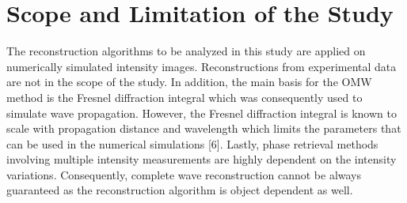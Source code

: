 \section{Scope and Limitation of the Study}
\hspace{\parindent}The reconstruction algorithms to be analyzed in this study are applied on numerically simulated intensity images. Reconstructions from experimental data are not in the scope of the study. In addition, the main basis for the OMW method is the Fresnel diffraction integral which was consequently used to simulate wave propagation. However, the Fresnel diffraction integral is known to scale with propagation distance and wavelength which limits the parameters that can be used in the numerical simulations [6]. Lastly, phase retrieval methods involving multiple intensity measurements are highly dependent on the intensity variations. Consequently, complete wave reconstruction cannot be always guaranteed as the reconstruction algorithm is object dependent as well.